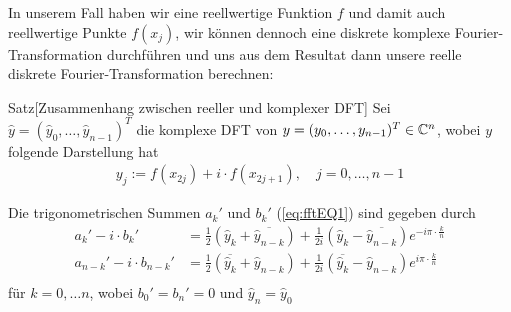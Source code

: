 In unserem Fall haben wir eine reellwertige Funktion $f$ und damit auch reellwertige Punkte $f(x_j)$, 
wir können dennoch eine diskrete komplexe Fourier-Transformation durchführen und uns aus dem Resultat 
dann unsere reelle diskrete Fourier-Transformation berechnen:

\begin{colbox}{Satz}[Zusammenhang zwischen reeller und komplexer DFT]
  Sei $\hat{y}=(\hat{y}_0,\dots,\hat{y}_{n-1})^T$ die komplexe DFT von 
  $y=(y_0,\dots,y_{n-1})^T\in\mathbb C^n$, wobei $y$ folgende Darstellung hat
  \begin{align*}
    y_j := f(x_{2j}) + i\cdot f(x_{2j+1}), \quad j=0,\dots, n-1
  \end{align*}
  
  Die trigonometrischen Summen $a_k'$ und $b_k'$ (\ref{eq:fftEQ1}) sind gegeben durch
  \begin{align*}
    a_k' - i\cdot b_k'
    &= \tfrac{1}{2}(\hat{y}_k + \overline{\hat{y}_{n-k}}) 
    + \tfrac{1}{2i}(\hat{y}_k - \overline{\hat{y}_{n-k}})e^{-i\pi\cdot\tfrac{k}{n}} \\
    a_{n-k}' - i\cdot b_{n-k}'
    &= \tfrac{1}{2}(\overline{\hat{y}_k} + \hat{y}_{n-k}) 
    + \tfrac{1}{2i}(\overline{\hat{y}_k} - \hat{y}_{n-k})e^{i\pi\cdot\tfrac{k}{n}} \\
  \end{align*}
  für $k=0,\dots n$, wobei $b_0'=b_n'=0$ und $\hat{y}_n=\hat{y}_0$
\end{colbox}


